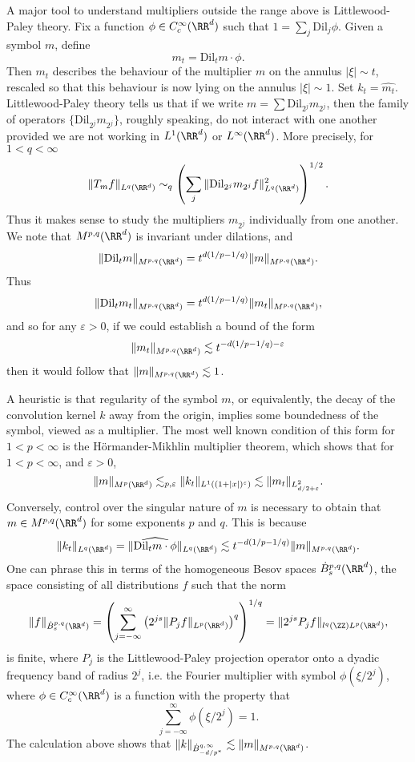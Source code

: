 A major tool to understand multipliers outside the range above is Littlewood-Paley theory. Fix a function $\phi \in C_c^\infty(\RR^d)$ such that $1 = \sum_j \text{Dil}_j \phi$. Given a symbol $m$, define
%
\[ m_t = \text{Dil}_t m \cdot \phi. \]
%
Then $m_t$ describes the behaviour of the multiplier $m$ on the annulus $|\xi| \sim t$, rescaled so that this behaviour is now lying on the annulus $|\xi| \sim 1$. Set $k_t = \widehat{m_t}$. Littlewood-Paley theory tells us that if we write $m = \sum \text{Dil}_{2^j} m_{2^j}$, then the family of operators $\{ \text{Dil}_{2^j} m_{2^j} \}$, roughly speaking, do not interact with one another provided we are not working in $L^1(\RR^d)$ or $L^\infty(\RR^d)$. More precisely, for $1 < q < \infty$
%
\[ \| T_m f \|_{L^q(\RR^d)} \sim_q \left( \sum_j \| \text{Dil}_{2^j} m_{2^j} f \|_{L^q(\RR^d)}^2 \right)^{1/2}. \]
%
Thus it makes sense to study the multipliers $m_{2^j}$ individually from one another. We note that $M^{p,q}(\RR^d)$ is invariant under dilations, and
\[ \| \text{Dil}_t m \|_{M^{p,q}(\RR^d)} = t^{d(1/p - 1/q)} \| m \|_{M^{p,q}(\RR^d)}. \]
%
Thus
%
\[ \| \text{Dil}_t m_t \|_{M^{p,q}(\RR^d)} = t^{d(1/p - 1/q)} \| m_t \|_{M^{p,q}(\RR^d)}, \]
%
and so for any $\varepsilon > 0$, if we could establish a bound of the form
%
\[ \| m_t \|_{M^{p,q}(\RR^d)} \lesssim t^{-d(1/p - 1/q) - \varepsilon} \]
%
then it would follow that $\| m \|_{M^{p,q}(\RR^d)} \lesssim 1$.

A heuristic is that regularity of the symbol $m$, or equivalently, the decay of the convolution kernel $k$ away from the origin, implies some boundedness of the symbol, viewed as a multiplier. The most well known condition of this form for $1 < p < \infty$ is the H\"{o}rmander-Mikhlin multiplier theorem, which shows that for $1 < p < \infty$, and $\varepsilon > 0$,
%
\[ \| m \|_{M^p(\RR^d)} \lesssim_{p,\varepsilon} \| k_t \|_{L^1((1 + |x|)^\varepsilon)} \lesssim \| m_t \|_{L^2_{d/2 + \varepsilon}}. \]
%
Conversely, control over the singular nature of $m$ is necessary to obtain that $m \in M^{p,q}(\RR^d)$ for some exponents $p$ and $q$. This is because
%
\[ \| k_t \|_{L^q(\RR^d)} = \| \widehat{\text{Dil}_t m \cdot \phi} \|_{L^q(\RR^d)} \lesssim t^{-d(1/p - 1/q)} \| m \|_{M^{p,q}(\RR^d)}. \]
%
One can phrase this in terms of the homogeneous Besov spaces $\dot{B}^{p,q}_s(\RR^d)$, the space consisting of all distributions $f$ such that the norm
%
\[ \| f \|_{\dot{B}^{p,q}_s(\RR^d)} = \left( \sum_{j = -\infty}^\infty \left( 2^{js} \| P_j f \|_{L^p(\RR^d)} \right)^q \right)^{1/q} = \| 2^{js} P_j f \|_{l^q(\ZZ) L^p(\RR^d)}, \]
%
is finite, where $P_j$ is the Littlewood-Paley projection operator onto a dyadic frequency band of radius $2^j$, i.e. the Fourier multiplier with symbol $\phi(\xi/2^j)$, where $\phi \in C_c^\infty(\RR^d)$ is a function with the property that
%
\[ \sum_{j = -\infty}^\infty \phi(\xi/2^j) = 1. \]
%
The calculation above shows that $\| k \|_{\dot{B}^{q,\infty}_{-d/p^*}} \lesssim \| m \|_{M^{p,q}(\RR^d)}$.

